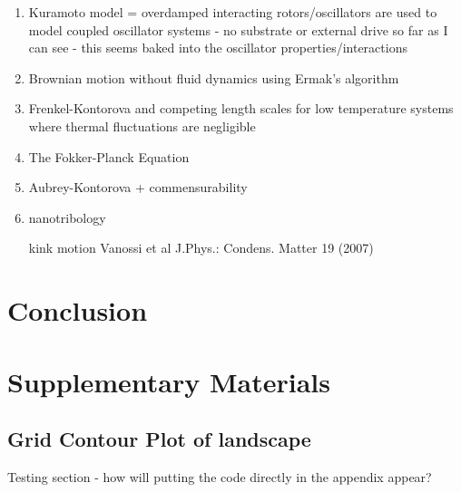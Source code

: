\documentclass[twocolumn,preprintnumbers,amsmath,amssymb,aps,prx]{revtex4}
\begin{document}
\begin{enumerate}
\item Kuramoto model = overdamped interacting rotors/oscillators are used to model coupled oscillator systems - no substrate or external drive so far as I can see - this seems baked into the oscillator properties/interactions

\item Brownian motion without fluid dynamics using  Ermak's algorithm

\item Frenkel-Kontorova and competing length scales for low temperature systems where thermal fluctuations are negligible

  \item The Fokker-Planck Equation

  \item Aubrey-Kontorova + commensurability

  \item nanotribology

    kink motion
    Vanossi et al J.Phys.: Condens. Matter 19 (2007)


    
\end{enumerate}

\section{Conclusion}
\label{sec:conclusion}	%

\section{Supplementary Materials}

\subsection{Grid Contour Plot of landscape}
Testing section - how will putting the code directly in the appendix appear?
\end{document}
